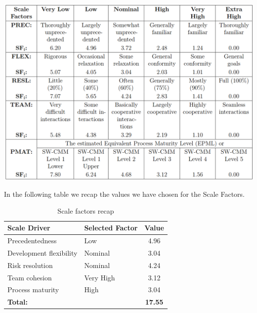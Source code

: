 \begin{minipage}{\textwidth}
\includegraphics[width=\textwidth, keepaspectratio]{../images/scale_factors_generic.png}
\end{minipage}

In the following table we recap the values we have chosen for the Scale Factors.

\begin{table}[!h]
\centering
\caption{Scale factors recap}
\label{scalefact-recap}
\begin{tabularx}{\linewidth}{XXc}
\hline
\textbf{Scale Driver}                & \textbf{Selected Factor} & \textbf{Value} \\ \hline
Precedentedness                      & Low                      & 4.96 \\
Development flexibility              & Nominal                  & 3.04 \\
Risk resolution              & Nominal                  & 4.24 \\
Team cohesion              & Very High                  & 3.12 \\
Process maturity              & High                  & 3.04 \\ \hline
\textbf{Total:}                      &                          & \textbf{17.55} \\
\end{tabularx}
\end{table}

